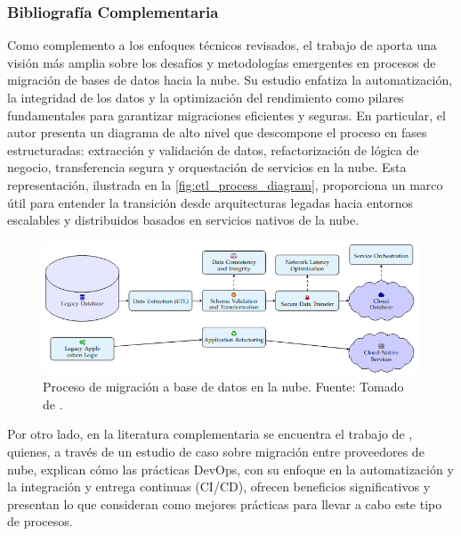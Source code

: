 \subsubsection{Bibliografía Complementaria}
Como complemento a los enfoques técnicos revisados, el trabajo de \textcite{Kansara2024} aporta una visión más amplia sobre los desafíos y metodologías emergentes en procesos de migración de bases de datos hacia la nube. Su estudio enfatiza la automatización, la integridad de los datos y la optimización del rendimiento como pilares fundamentales para garantizar migraciones eficientes y seguras. En particular, el autor presenta un diagrama de alto nivel que descompone el proceso en fases estructuradas: extracción y validación de datos, refactorización de lógica de negocio, transferencia segura y orquestación de servicios en la nube. Esta representación, ilustrada en la \autoref{fig:etl_process_diagram}, proporciona un marco útil para entender la transición desde arquitecturas legadas hacia entornos escalables y distribuidos basados en servicios nativos de la nube.

\begin{figure}[H]
\centering
\includegraphics[width=1\textwidth]{img/figures/fig6-etl-process.png}
\caption{Proceso de migración a base de datos en la nube. Fuente: Tomado de \cite{Kansara2024}.}
\label{fig:etl_process_diagram}
\end{figure}

Por otro lado, en la literatura complementaria se encuentra el trabajo de \textcite{Kyadasu2025}, quienes, a través de un estudio de caso sobre migración entre proveedores de nube, explican cómo las prácticas DevOps, con su enfoque en la automatización y la integración y entrega continuas (CI/CD), ofrecen beneficios significativos y presentan lo que consideran como mejores prácticas para llevar a cabo este tipo de procesos.
